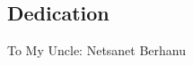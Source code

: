 



\begin{otherlanguage}{american}
	\chapter*{Dedication}
	
	\medskip
	
	\noindent
	
\end{otherlanguage}

\medskip

To My Uncle: Netsanet Berhanu 